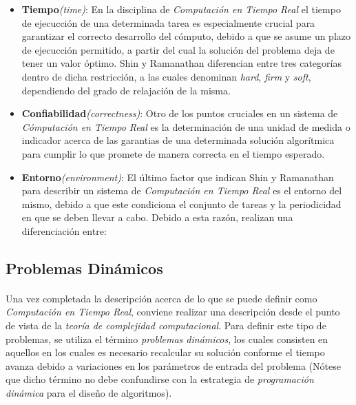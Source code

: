 \documentclass{subfiles}
\begin{document}
        \begin{itemize}

          \item \textbf{Tiempo}\emph{(time)}: En la disciplina de \emph{Computación en Tiempo Real} el tiempo de ejecucción de una determinada tarea es especialmente crucial para garantizar el correcto desarrollo del cómputo, debido a que se asume un plazo de ejecucción permitido, a partir del cual la solución del problema deja de tener un valor óptimo. Shin y Ramanathan\cite{259423} diferencian entre tres categorías dentro de dicha restricción, a las cuales denominan \emph{hard}, \emph{firm} y \emph{soft}, dependiendo del grado de relajación de la misma.

          \item \textbf{Confiabilidad}\emph{(correctness)}: Otro de los puntos cruciales en un sistema de \emph{Cómputación en Tiempo Real} es la determinación de una unidad de medida o indicador acerca de las garantias de una determinada solución algorítmica para cumplir lo que promete de manera correcta en el tiempo esperado.

          \item \textbf{Entorno}\emph{(environment)}: El último factor que indican Shin y Ramanathan\cite{259423} para describir un sistema de \emph{Computación en Tiempo Real} es el entorno del mismo, debido a que este condiciona el conjunto de tareas y la periodicidad en que se deben llevar a cabo. Debido a esta razón, realizan una diferenciación entre:

        \end{itemize}


      \subsection{Problemas Dinámicos}
      \label{sec:dynamic_problems}

        \paragraph{}
        Una vez completada la descripción acerca de lo que se puede definir como \emph{Computación en Tiempo Real}, conviene realizar una descripción desde el punto de vista de la \emph{teoría de complejidad computacional}. Para definir este tipo de problemas, se utiliza el término \emph{problemas dinámicos}, los cuales consisten en aquellos en los cuales es necesario recalcular su solución conforme el tiempo avanza debido a variaciones en los parámetros de entrada del problema (Nótese que dicho término no debe confundirse con la estrategia de \emph{programación dinámica} para el diseño de algoritmos).
\end{document}
